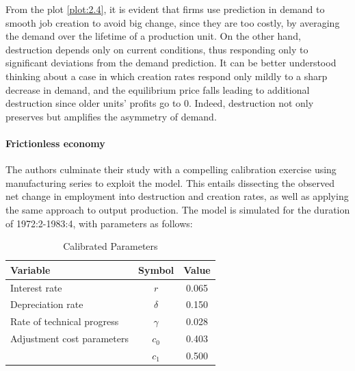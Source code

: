 \documentclass[12pt]{report}
\begin{document}
From the plot \ref{plot:2.4}, it is evident that firms use prediction in demand to smooth job creation to avoid
big change, since they are too costly, by averaging the demand over the lifetime of a production unit. On the other
hand, destruction depends only on current conditions, thus responding only to significant deviations from the demand
prediction. It can be better understood thinking about a case in which creation rates respond only mildly to a sharp
decrease in demand, and the equilibrium price falls leading to additional destruction since older units' profits go to 0.
Indeed, destruction not only preserves but amplifies the asymmetry of demand.\paragraph{Frictionless economy}
\par
The authors culminate their study with a compelling calibration exercise using manufacturing series to exploit the
model. This entails dissecting the observed net change in employment into destruction and creation rates, as well as
applying the same approach to output production. The model is simulated for the duration of 1972:2-1983:4, with
parameters as follows: 


\begin{table}[ht]
    \centering
    \caption{Calibrated Parameters}
    \label{Tab2.1}
    \begin{tabular}{lcc}
    \hline \hline
    Variable & Symbol & Value \\
    \hline
    Interest rate & $r$ & 0.065 \\
    Depreciation rate & $\delta$ & 0.150 \\
    Rate of technical progress & $\gamma$ & 0.028 \\
    Adjustment cost parameters & $c_0$ & 0.403 \\
     & $c_1$ & 0.500 \\
    \hline
    \end{tabular}
    \end{table}
    
\end{document}
